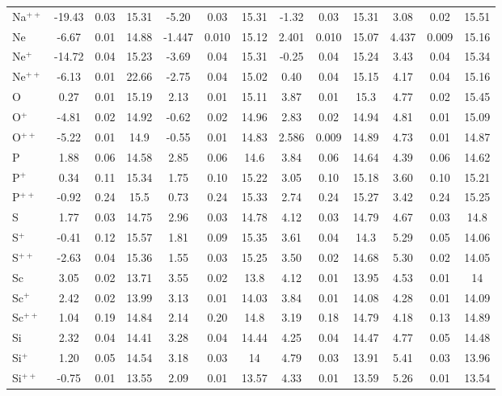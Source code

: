 \begin{longtable}{l!{\vrule width 0.25pt}ccc!{\vrule width 0.25pt}ccc!{\vrule width 0.25pt}ccc!{\vrule width 0.25pt}ccc}
Na$^{++}$ & -19.43 & 0.03 & 15.31 & -5.20 & 0.03 & 15.31 & -1.32 & 0.03 & 15.31 & 3.08 & 0.02 & 15.51 \\
Ne & -6.67 & 0.01 & 14.88 & -1.447 & 0.010 & 15.12 & 2.401 & 0.010 & 15.07 & 4.437 & 0.009 & 15.16 \\
Ne$^+$ & -14.72 & 0.04 & 15.23 & -3.69 & 0.04 & 15.31 & -0.25 & 0.04 & 15.24 & 3.43 & 0.04 & 15.34 \\
Ne$^{++}$ & -6.13 & 0.01 & 22.66 & -2.75 & 0.04 & 15.02 & 0.40 & 0.04 & 15.15 & 4.17 & 0.04 & 15.16 \\
O & 0.27 & 0.01 & 15.19 & 2.13 & 0.01 & 15.11 & 3.87 & 0.01 & 15.3 & 4.77 & 0.02 & 15.45 \\
O$^+$ & -4.81 & 0.02 & 14.92 & -0.62 & 0.02 & 14.96 & 2.83 & 0.02 & 14.94 & 4.81 & 0.01 & 15.09 \\
O$^{++}$ & -5.22 & 0.01 & 14.9 & -0.55 & 0.01 & 14.83 & 2.586 & 0.009 & 14.89 & 4.73 & 0.01 & 14.87 \\
P & 1.88 & 0.06 & 14.58 & 2.85 & 0.06 & 14.6 & 3.84 & 0.06 & 14.64 & 4.39 & 0.06 & 14.62 \\
P$^+$ & 0.34 & 0.11 & 15.34 & 1.75 & 0.10 & 15.22 & 3.05 & 0.10 & 15.18 & 3.60 & 0.10 & 15.21 \\
P$^{++}$ & -0.92 & 0.24 & 15.5 & 0.73 & 0.24 & 15.33 & 2.74 & 0.24 & 15.27 & 3.42 & 0.24 & 15.25 \\
S & 1.77 & 0.03 & 14.75 & 2.96 & 0.03 & 14.78 & 4.12 & 0.03 & 14.79 & 4.67 & 0.03 & 14.8 \\
S$^+$ & -0.41 & 0.12 & 15.57 & 1.81 & 0.09 & 15.35 & 3.61 & 0.04 & 14.3 & 5.29 & 0.05 & 14.06 \\
S$^{++}$ & -2.63 & 0.04 & 15.36 & 1.55 & 0.03 & 15.25 & 3.50 & 0.02 & 14.68 & 5.30 & 0.02 & 14.05 \\
Sc & 3.05 & 0.02 & 13.71 & 3.55 & 0.02 & 13.8 & 4.12 & 0.01 & 13.95 & 4.53 & 0.01 & 14 \\
Sc$^+$ & 2.42 & 0.02 & 13.99 & 3.13 & 0.01 & 14.03 & 3.84 & 0.01 & 14.08 & 4.28 & 0.01 & 14.09 \\
Sc$^{++}$ & 1.04 & 0.19 & 14.84 & 2.14 & 0.20 & 14.8 & 3.19 & 0.18 & 14.79 & 4.18 & 0.13 & 14.89 \\
Si & 2.32 & 0.04 & 14.41 & 3.28 & 0.04 & 14.44 & 4.25 & 0.04 & 14.47 & 4.77 & 0.05 & 14.48 \\
Si$^+$ & 1.20 & 0.05 & 14.54 & 3.18 & 0.03 & 14 & 4.79 & 0.03 & 13.91 & 5.41 & 0.03 & 13.96 \\
Si$^{++}$ & -0.75 & 0.01 & 13.55 & 2.09 & 0.01 & 13.57 & 4.33 & 0.01 & 13.59 & 5.26 & 0.01 & 13.54 \\

\end{longtable}
